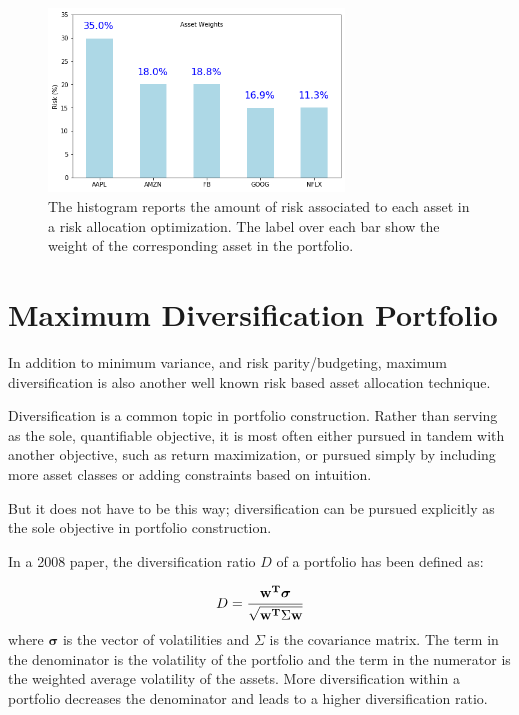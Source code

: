 \begin{figure}[htb]
	\centering
	\includegraphics[width=0.7\textwidth]{figures/risk_allocation.png}
	\caption{The histogram reports the amount of risk associated to each asset in a risk allocation optimization. The label over each bar show the weight of the corresponding asset in the portfolio.}
	\label{fig:risk_allocation}
\end{figure}



\section{Maximum Diversification Portfolio}\label{maximum-diversification-portfolio}

In addition to minimum variance, and risk parity/budgeting, maximum diversification is also another well known risk based asset allocation technique.

Diversification is a common topic in portfolio construction. Rather than serving as the sole, quantifiable objective, it is most often either pursued in tandem with another objective, such as return maximization, or pursued simply by including more asset classes or adding constraints based on intuition.

But it does not have to be this way; diversification can be pursued explicitly as the sole objective in portfolio construction.

In a 2008 paper, the diversification ratio $D$ of a portfolio has been defined as:

\[
D=\cfrac{\mathbf{w^T}\boldsymbol{\sigma}}{\sqrt {\mathbf{w^T}\Sigma \mathbf{w}}} 
\]
where $\boldsymbol{\sigma}$ is the vector of volatilities and $\Sigma$ is the covariance matrix. The term in the denominator is the volatility of the portfolio and the term in the numerator is the weighted average volatility of the assets. More diversification within a portfolio decreases the denominator and leads to a higher diversification ratio.


